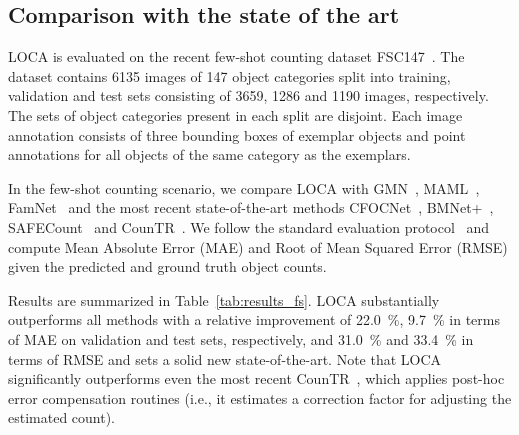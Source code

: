\documentclass[10pt,twocolumn,letterpaper]{article}
\begin{document}
\subsection{Comparison with the state of the art}
\label{sec:sota}

LOCA is evaluated on the recent few-shot counting dataset FSC147~\cite{famnet}. The dataset contains 6135 images of 147 object categories split into training, validation and test sets consisting of 3659, 1286 and 1190 images, respectively. The sets of object categories present in each split are disjoint. Each image annotation consists of three bounding boxes of exemplar objects and point annotations for all objects of the same category as the exemplars.




In the few-shot counting scenario, we compare LOCA with GMN~\cite{gmn}, MAML~\cite{maml}, FamNet~\cite{famnet} and the most recent state-of-the-art methods CFOCNet~\cite{cfocnet}, BMNet+~\cite{bmnet}, SAFECount~\cite{safecount} and CounTR~\cite{countr}.  We follow the standard evaluation protocol~\cite{famnet, bmnet, safecount} and compute Mean Absolute Error (MAE) and Root of Mean Squared Error (RMSE) given the predicted and ground truth object counts.  

Results are summarized in Table~\ref{tab:results_fs}. LOCA substantially outperforms all methods with a relative improvement of 22.0~\%, 9.7~\% in terms of MAE on validation and test sets, respectively, and 31.0~\% and 33.4~\% in terms of RMSE and sets a solid new state-of-the-art. Note that LOCA significantly outperforms even the most recent CounTR~\cite{countr}, which applies post-hoc error compensation routines (i.e., it estimates a correction factor for adjusting the estimated count).
\end{document}
